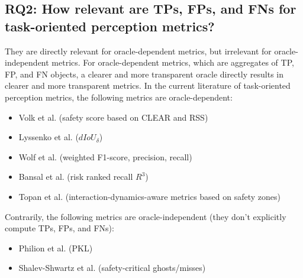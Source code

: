 \documentclass[conference]{IEEEtran}
\begin{document}









\subsection{RQ2: How relevant are TPs, FPs, and FNs for task-oriented perception metrics?}
\label{sec:discussion_rq2}

They are directly relevant for oracle-dependent metrics, but irrelevant for oracle-independent metrics.
For oracle-dependent metrics, which are aggregates of TP, FP, and FN objects, a clearer and more transparent oracle directly results in clearer and more transparent metrics. 
In the current literature of task-oriented perception metrics, the following metrics are oracle-dependent:
\begin{itemize}
	\item Volk et al. (safety score based on CLEAR and RSS) \cite{Volk2020metric}
	\item Lyssenko et al. ($dIoU_\delta$) \cite{Lyssenko2021relevance}
	\item Wolf et al. (weighted F1-score, precision, recall) \cite{Wolf2021people}
	\item Bansal et al. (risk ranked recall $R^3$) \cite{Bansal2021riskrankedrecall}
	\item Topan et al. (interaction-dynamics-aware metrics based on safety zones) \cite{Topan2022zones}
\end{itemize}
Contrarily, the following metrics are oracle-independent (they don't explicitly compute TPs, FPs, and FNs): %
\begin{itemize}
	\item Philion et al. (PKL) \cite{Philion2020planner_centric}
	\item Shalev-Shwartz et al. (safety-critical ghosts/misses) \cite{shalevshwartz2017formalRSS}
\end{itemize}
\end{document}
